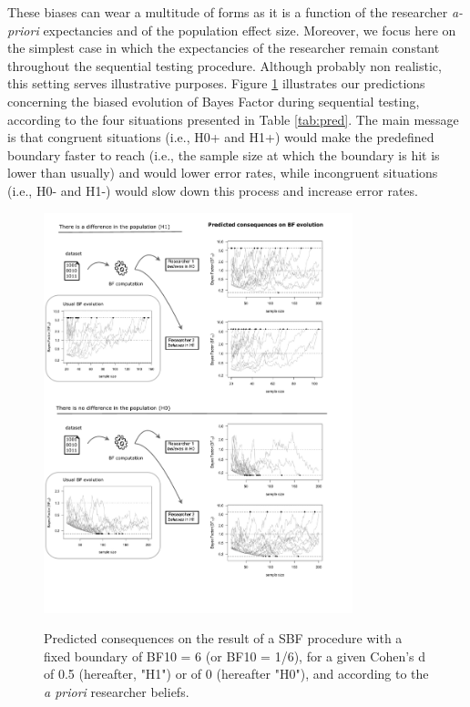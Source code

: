 \documentclass[a4paper,man,natbib,floatsintext,donotrepeattitle]{apa6}
\begin{document}

These biases can wear a multitude of forms as it is a function of the researcher \textit{a-priori} expectancies and of the population effect size. Moreover, we focus here on the simplest case in which the expectancies of the researcher remain constant throughout the sequential testing procedure. Although probably non realistic, this setting serves illustrative purposes. Figure \ref{fig:pred} illustrates our predictions concerning the biased evolution of Bayes Factor during sequential testing, according to the four situations presented in Table \ref{tab:pred}. The main message is that congruent situations (i.e., H0+ and H1+) would make the predefined boundary faster to reach (i.e., the sample size at which the boundary is hit is lower than usually) and would lower error rates, while incongruent situations (i.e., H0- and H1-) would slow down this process and increase error rates.

\begin{figure}[H]
  \caption{Predicted consequences on the result of a SBF procedure with a fixed boundary of BF10 = 6 (or BF10 = 1/6), for a given Cohen's d of 0.5 (hereafter, "H1") or of 0 (hereafter "H0"), and according to the \emph{a priori} researcher beliefs.}
  \centering
  \includegraphics[width=0.8\textwidth]{figures/BFF_predictions.pdf}
  \label{fig:pred}
\end{figure}
\end{document}

